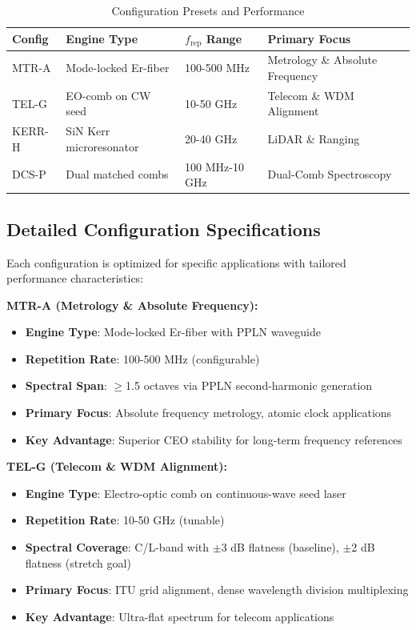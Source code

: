 \documentclass[11pt,a4paper]{article}
\begin{document}
\begin{table}[ht]
\centering
\caption{Configuration Presets and Performance}
\begin{tabular}{@{}llll@{}}
\toprule
\textbf{Config} & \textbf{Engine Type} & \textbf{$f_{\text{rep}}$ Range} & \textbf{Primary Focus} \\
\midrule
MTR-A & Mode-locked Er-fiber & 100-500 MHz & Metrology \& Absolute Frequency \\
TEL-G & EO-comb on CW seed & 10-50 GHz & Telecom \& WDM Alignment \\
KERR-H & SiN Kerr microresonator & 20-40 GHz & LiDAR \& Ranging \\
DCS-P & Dual matched combs & 100 MHz-10 GHz & Dual-Comb Spectroscopy \\
\bottomrule
\end{tabular}
\end{table}

\subsection{Detailed Configuration Specifications}
Each configuration is optimized for specific applications with tailored performance characteristics:

\textbf{MTR-A (Metrology \& Absolute Frequency):}
\begin{itemize}
\item \textbf{Engine Type}: Mode-locked Er-fiber with PPLN waveguide
\item \textbf{Repetition Rate}: 100-500 MHz (configurable)
\item \textbf{Spectral Span}: $\geq$1.5 octaves via PPLN second-harmonic generation
\item \textbf{Primary Focus}: Absolute frequency metrology, atomic clock applications
\item \textbf{Key Advantage}: Superior CEO stability for long-term frequency references
\end{itemize}

\textbf{TEL-G (Telecom \& WDM Alignment):}
\begin{itemize}
\item \textbf{Engine Type}: Electro-optic comb on continuous-wave seed laser
\item \textbf{Repetition Rate}: 10-50 GHz (tunable)
\item \textbf{Spectral Coverage}: C/L-band with $\pm$3 dB flatness (baseline), $\pm$2 dB flatness (stretch goal)
\item \textbf{Primary Focus}: ITU grid alignment, dense wavelength division multiplexing
\item \textbf{Key Advantage}: Ultra-flat spectrum for telecom applications
\end{itemize}
\end{document}
